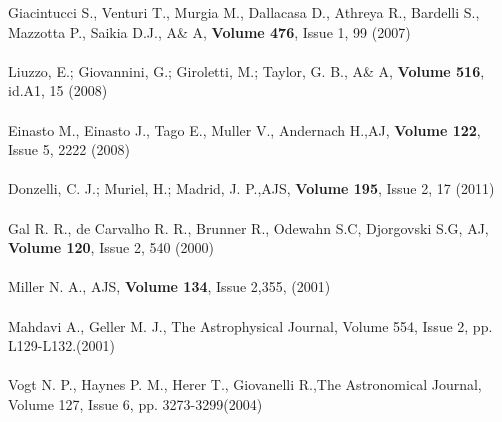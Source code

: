 Giacintucci S., Venturi T., Murgia M., Dallacasa D., Athreya R., Bardelli S., Mazzotta P., Saikia D.J., A\& A, \textbf{Volume 476}, Issue 1, 99 (2007)\\\\
Liuzzo, E.; Giovannini, G.; Giroletti, M.; Taylor, G. B., A\& A, \textbf{Volume 516}, id.A1, 15 (2008)\\\\
Einasto M., Einasto J., Tago E., Muller V., Andernach H.,AJ, \textbf{Volume 122}, Issue 5, 2222 (2008)\\\\
Donzelli, C. J.; Muriel, H.; Madrid, J. P.,AJS, \textbf{Volume 195}, Issue 2, 17 (2011)\\\\
Gal R. R., de Carvalho R. R., Brunner R., Odewahn S.C, Djorgovski S.G, AJ, \textbf{Volume 120}, Issue 2, 540 (2000)\\\\
Miller N. A., AJS, \textbf{Volume 134}, Issue 2,355, (2001)\\\\
Mahdavi A., Geller M. J., The Astrophysical Journal, Volume 554, Issue 2, pp. L129-L132.(2001)\\\\
Vogt N. P., Haynes P. M., Herer T., Giovanelli R.,The Astronomical Journal, Volume 127, Issue 6, pp. 3273-3299(2004)\\\\
